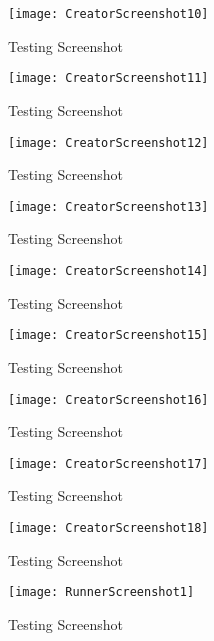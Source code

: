 \documentclass[a4paper, 11pt]{article}
\begin{document}
\begin{appendix}
\begin{multicols}{2}
\begin{figure}[H]
\centering
\texttt{[image: CreatorScreenshot10]}
\caption{Testing Screenshot}
\label{CreatorScreenshot10}
\end{figure}

\begin{figure}[H]
\centering
\texttt{[image: CreatorScreenshot11]}
\caption{Testing Screenshot}
\label{CreatorScreenshot11}
\end{figure}

\begin{figure}[H]
\centering
\texttt{[image: CreatorScreenshot12]}
\caption{Testing Screenshot}
\label{CreatorScreenshot12}
\end{figure}

\begin{figure}[H]
\centering
\texttt{[image: CreatorScreenshot13]}
\caption{Testing Screenshot}
\label{CreatorScreenshot13}
\end{figure}

\begin{figure}[H]
\centering
\texttt{[image: CreatorScreenshot14]}
\caption{Testing Screenshot}
\label{CreatorScreenshot14}
\end{figure}

\begin{figure}[H]
\centering
\texttt{[image: CreatorScreenshot15]}
\caption{Testing Screenshot}
\label{CreatorScreenshot15}
\end{figure}

\begin{figure}[H]
\centering
\texttt{[image: CreatorScreenshot16]}
\caption{Testing Screenshot}
\label{CreatorScreenshot16}
\end{figure}

\begin{figure}[H]
\centering
\texttt{[image: CreatorScreenshot17]}
\caption{Testing Screenshot}
\label{CreatorScreenshot17}
\end{figure}

\begin{figure}[H]
\centering
\texttt{[image: CreatorScreenshot18]}
\caption{Testing Screenshot}
\label{CreatorScreenshot18}
\end{figure}

\begin{figure}[H]
\centering
\texttt{[image: RunnerScreenshot1]}
\caption{Testing Screenshot}
\label{RunnerScreenshot1}
\end{figure}


\end{multicols}
\end{appendix}
\end{document}
